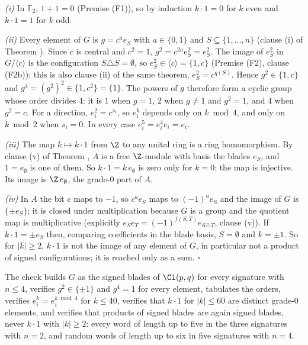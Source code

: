 \emph{(i)} In $\mathbb{F}_{2}$, $1 + 1 = 0$ (Premise (F1)), so by induction $k \cdot 1 = 0$ for $k$ even and $k \cdot 1 = 1$ for $k$ odd.

\emph{(ii)} Every element of $G$ is $g = c^{a}e_{S}$ with $a \in \{0, 1\}$ and $S \subseteq \{1, \dots, n\}$ (clause (i) of Theorem ). Since $c$ is central and $c^{2} = 1$, $g^{2} = c^{2a}e_{S}^{2} = e_{S}^{2}$. The image of $e_{S}^{2}$ in $G/\langle c\rangle$ is the configuration $S \triangle S = \emptyset$, so $e_{S}^{2} \in \langle c\rangle = \{1, c\}$ (Premise (F2), clause (F2b)); this is also clause (ii) of the same theorem, $e_{S}^{2} = c^{q(S)}$. Hence $g^{2} \in \{1, c\}$ and $g^{4} = (g^{2})^{2} \in \{1, c^{2}\} = \{1\}$. The powers of $g$ therefore form a cyclic group whose order divides $4$: it is $1$ when $g = 1$, $2$ when $g \ne 1$ and $g^{2} = 1$, and $4$ when $g^{2} = c$. For a direction, $e_{i}^{2} = c^{s_{i}}$, so $e_{i}^{k}$ depends only on $k \bmod 4$, and only on $k \bmod 2$ when $s_{i} = 0$. In every case $e_{i}^{5} = e_{i}^{4}e_{i} = e_{i}$.

\emph{(iii)} The map $k \mapsto k \cdot 1$ from $\Z$ to any unital ring is a ring homomorphism. By clause (v) of Theorem , $A$ is a free $\Z$-module with basis the blades $e_{S}$, and $1 = e_{\emptyset}$ is one of them. So $k \cdot 1 = k\,e_{\emptyset}$ is zero only for $k = 0$: the map is injective. Its image is $\Z\,e_{\emptyset}$, the grade-$0$ part of $A$.

\emph{(iv)} In $A$ the bit $c$ maps to $-1$, so $c^{a}e_{S}$ maps to $(-1)^{a}e_{S}$ and the image of $G$ is $\{\pm e_{S}\}$; it is closed under multiplication because $G$ is a group and the quotient map is multiplicative (explicitly $e_{S}e_{T} = (-1)^{f(S,T)}e_{S \triangle T}$, clause (v)). If $k \cdot 1 = \pm e_{S}$ then, comparing coefficients in the blade basis, $S = \emptyset$ and $k = \pm 1$. So for $|k| \ge 2$, $k \cdot 1$ is not the image of any element of $G$, in particular not a product of signed configurations; it is reached only as a sum. $\square$

The check builds $G$ as the signed blades of $\Cl(p,q)$ for every signature with $n \le 4$, verifies $g^{2} \in \{\pm 1\}$ and $g^{4} = 1$ for every element, tabulates the orders, verifies $e_{i}^{k} = e_{i}^{k \bmod 4}$ for $k \le 40$, verifies that $k \cdot 1$ for $|k| \le 60$ are distinct grade-$0$ elements, and verifies that products of signed blades are again signed blades, never $k \cdot 1$ with $|k| \ge 2$: every word of length up to five in the three signatures with $n = 2$, and random words of length up to six in five signatures with $n = 4$.
